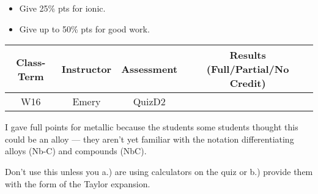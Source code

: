 \begin{rubric}

\begin{itemize}
	\item Give 25\% pts for ionic. 
	\item Give up to 50\% pts for good work. 
\end{itemize}

\end{rubric}

\begin{outcomes}
	\begin{center}
		\begin{tabular}{cccc}
			\hline\hline
                Class-Term & Instructor & Assessment & Results (Full/Partial/No Credit) \\
			\hline
                W16 & Emery & QuizD2 &  \\
			\hline
		\end{tabular}
	\end{center}
\end{outcomes}

\begin{comments}

I gave full points for metallic because the students some students thought this could be an alloy --- they aren't yet familiar with the notation differentiating alloys (Nb-C) and compounds (NbC).

Don't use this unless you a.) are using calculators on the quiz or b.) provide them with the form of the Taylor expansion.
	
\end{comments}